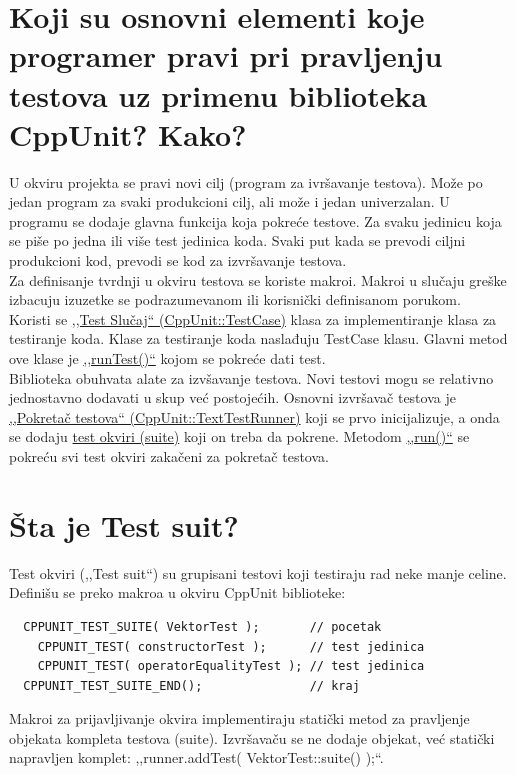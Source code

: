 \documentclass[a4paper]{article}
\begin{document}
\section{Koji su osnovni elementi koje programer pravi pri pravljenju testova uz primenu biblioteka CppUnit? Kako?}
  U okviru projekta se pravi novi cilj (program za ivršavanje testova). Može po jedan program za svaki
  produkcioni cilj, ali može i jedan univerzalan. U programu se dodaje glavna funkcija koja pokreće
  testove. Za svaku jedinicu koja se piše po jedna ili više test jedinica koda. Svaki put kada
  se prevodi ciljni produkcioni kod, prevodi se kod za izvršavanje testova.\\
  \indent Za definisanje tvrdnji u okviru testova se koriste makroi. Makroi u slučaju greške izbacuju
  izuzetke se podrazumevanom ili korisnički definisanom porukom. \\
  \indent Koristi se \underline{,,Test Slučaj`` (CppUnit::TestCase)} klasa za implementiranje klasa za 
  testiranje koda. Klase za testiranje koda naslađuju TestCase klasu. Glavni metod ove klase 
  je \underline{,,runTest()``} kojom se pokreće dati test. \\
  \indent Biblioteka obuhvata alate za izvšavanje testova. Novi testovi mogu se relativno jednostavno 
  dodavati u skup već postojećih. Osnovni izvršavač testova je \underline{,,Pokretač testova`` 
  (CppUnit::TextTestRunner)} koji se prvo inicijalizuje, a onda se dodaju \underline{test okviri (suite)} 
  koji on treba da pokrene. Metodom \underline{,,run()``} se pokreću svi test okviri zakačeni za 
  pokretač testova. 

\section{Šta je Test suit?}
  Test okviri (,,Test suit``) su grupisani testovi koji testiraju rad neke manje celine. 
  Definišu se preko makroa u okviru CppUnit biblioteke:
\begin{lstlisting}
  CPPUNIT_TEST_SUITE( VektorTest );       // pocetak
    CPPUNIT_TEST( constructorTest );      // test jedinica
    CPPUNIT_TEST( operatorEqualityTest ); // test jedinica
  CPPUNIT_TEST_SUITE_END();               // kraj \end{lstlisting}
  Makroi za prijavljivanje okvira implementiraju statički metod za pravljenje objekata kompleta testova
  (suite). Izvršavaču se ne dodaje objekat, već statički napravljen komplet: 
  ,,runner.addTest( VektorTest::suite() );``.
\end{document}
